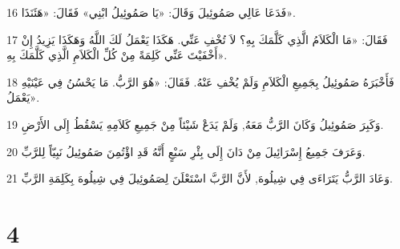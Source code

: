\par 16 فَدَعَا عَالِي صَمُوئِيلَ وَقَالَ: «يَا صَمُوئِيلُ ابْنِي» فَقَالَ: «هَئَنَذَا».
\par 17 فَقَالَ: «مَا الْكَلاَمُ الَّذِي كَلَّمَكَ بِهِ؟ لاَ تُخْفِ عَنِّي. هَكَذَا يَعْمَلُ لَكَ اللَّهُ وَهَكَذَا يَزِيدُ إِنْ أَخْفَيْتَ عَنِّي كَلِمَةً مِنْ كُلِّ الْكَلاَمِ الَّذِي كَلَّمَكَ بِهِ».
\par 18 فَأَخْبَرَهُ صَمُوئِيلُ بِجَمِيعِ الْكَلاَمِ وَلَمْ يُخْفِ عَنْهُ. فَقَالَ: «هُوَ الرَّبُّ. مَا يَحْسُنُ فِي عَيْنَيْهِ يَعْمَلُ».
\par 19 وَكَبِرَ صَمُوئِيلُ وَكَانَ الرَّبُّ مَعَهُ, وَلَمْ يَدَعْ شَيْئاً مِنْ جَمِيعِ كَلاَمِهِ يَسْقُطُ إِلَى الأَرْضِ.
\par 20 وَعَرَفَ جَمِيعُ إِسْرَائِيلَ مِنْ دَانَ إِلَى بِئْرِ سَبْعٍ أَنَّهُ قَدِ اؤْتُمِنَ صَمُوئِيلُ نَبِيّاً لِلرَّبِّ.
\par 21 وَعَادَ الرَّبُّ يَتَرَاءَى فِي شِيلُوهَ, لأَنَّ الرَّبَّ اسْتَعْلَنَ لِصَمُوئِيلَ فِي شِيلُوهَ بِكَلِمَةِ الرَّبِّ.

\chapter{4}

